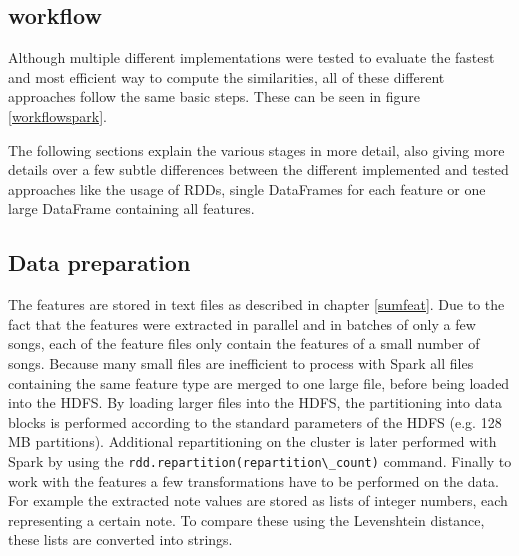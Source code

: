 \subsection{workflow}

Although multiple different implementations were tested to evaluate the fastest and most efficient way to compute the similarities, all of these different approaches follow the same basic steps. These can be seen in figure \ref{workflowspark}.  

\begin{figure}[htbp]
	\centering
\end{figure}
\FloatBarrier

\noindent The following sections explain the various stages in more detail, also giving more details over a few subtle differences between the different implemented and tested approaches like the usage of RDDs, single DataFrames for each feature or one large DataFrame containing all features. 

\subsection{Data preparation}

The features are stored in text files as described in chapter \ref{sumfeat}. Due to the fact that the features were extracted in parallel and in batches of only a few songs, each of the feature files only contain the features of a small number of songs. Because many small files are inefficient to process with Spark \cite[p. 153]{sparkbook1} all files containing the same feature type are merged to one large file, before being loaded into the HDFS. By loading larger files into the HDFS, the partitioning into data blocks is performed according to the standard parameters of the HDFS (e.g. 128 MB partitions). Additional repartitioning on the cluster is later performed with Spark by using the \lstinline{rdd.repartition(repartition\_count)} command. 
Finally to work with the features a few transformations have to be performed on the data. For example the extracted note values are stored as lists of integer numbers, each representing a certain note. To compare these using the Levenshtein distance, these lists are converted into strings. 

